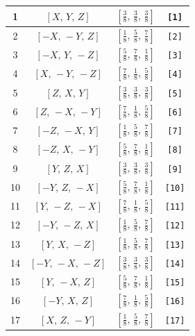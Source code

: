 \documentclass[fleqn,8pt]{jsarticle}
\begin{document}
\begin{longtable}{cccc}
1 & $\left[ X,\, Y,\, Z \right]$ & $\left[ \frac{3}{8},\, \frac{3}{8},\, \frac{3}{8} \right]$ & {\tt [1]} \\ \hline
2 & $\left[ - X,\, - Y,\, Z \right]$ & $\left[ \frac{1}{8},\, \frac{5}{8},\, \frac{7}{8} \right]$ & {\tt [2]} \\ \hline
3 & $\left[ - X,\, Y,\, - Z \right]$ & $\left[ \frac{5}{8},\, \frac{7}{8},\, \frac{1}{8} \right]$ & {\tt [3]} \\ \hline
4 & $\left[ X,\, - Y,\, - Z \right]$ & $\left[ \frac{7}{8},\, \frac{1}{8},\, \frac{5}{8} \right]$ & {\tt [4]} \\ \hline
5 & $\left[ Z,\, X,\, Y \right]$ & $\left[ \frac{3}{8},\, \frac{3}{8},\, \frac{3}{8} \right]$ & {\tt [5]} \\ \hline
6 & $\left[ Z,\, - X,\, - Y \right]$ & $\left[ \frac{7}{8},\, \frac{1}{8},\, \frac{5}{8} \right]$ & {\tt [6]} \\ \hline
7 & $\left[ - Z,\, - X,\, Y \right]$ & $\left[ \frac{1}{8},\, \frac{5}{8},\, \frac{7}{8} \right]$ & {\tt [7]} \\ \hline
8 & $\left[ - Z,\, X,\, - Y \right]$ & $\left[ \frac{5}{8},\, \frac{7}{8},\, \frac{1}{8} \right]$ & {\tt [8]} \\ \hline
9 & $\left[ Y,\, Z,\, X \right]$ & $\left[ \frac{3}{8},\, \frac{3}{8},\, \frac{3}{8} \right]$ & {\tt [9]} \\ \hline
10 & $\left[ - Y,\, Z,\, - X \right]$ & $\left[ \frac{5}{8},\, \frac{7}{8},\, \frac{1}{8} \right]$ & {\tt [10]} \\ \hline
11 & $\left[ Y,\, - Z,\, - X \right]$ & $\left[ \frac{7}{8},\, \frac{1}{8},\, \frac{5}{8} \right]$ & {\tt [11]} \\ \hline
12 & $\left[ - Y,\, - Z,\, X \right]$ & $\left[ \frac{1}{8},\, \frac{5}{8},\, \frac{7}{8} \right]$ & {\tt [12]} \\ \hline
13 & $\left[ Y,\, X,\, - Z \right]$ & $\left[ \frac{1}{8},\, \frac{5}{8},\, \frac{7}{8} \right]$ & {\tt [13]} \\ \hline
14 & $\left[ - Y,\, - X,\, - Z \right]$ & $\left[ \frac{3}{8},\, \frac{3}{8},\, \frac{3}{8} \right]$ & {\tt [14]} \\ \hline
15 & $\left[ Y,\, - X,\, Z \right]$ & $\left[ \frac{5}{8},\, \frac{7}{8},\, \frac{1}{8} \right]$ & {\tt [15]} \\ \hline
16 & $\left[ - Y,\, X,\, Z \right]$ & $\left[ \frac{7}{8},\, \frac{1}{8},\, \frac{5}{8} \right]$ & {\tt [16]} \\ \hline
17 & $\left[ X,\, Z,\, - Y \right]$ & $\left[ \frac{1}{8},\, \frac{5}{8},\, \frac{7}{8} \right]$ & {\tt [17]} \\ \hline

\end{longtable}
\end{document}
